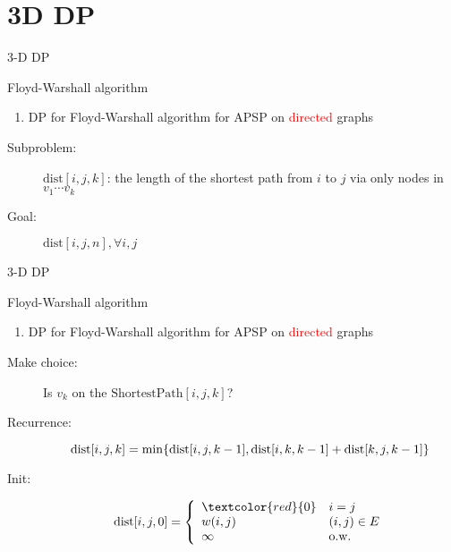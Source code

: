 \section{3D DP}

\begin{frame}{3-D DP}
  \begin{exampleblock}{Floyd-Warshall algorithm}
	\begin{enumerate}[(1)]
	  \item DP for Floyd-Warshall algorithm for APSP on \textcolor{red}{directed} graphs
	\end{enumerate}
  \end{exampleblock}

  \begin{description}
	\item[Subproblem:] $\text{dist}[i,j,k]$: the length of the shortest path from $i$ to $j$ via only nodes in $v_{1} \cdots v_{k}$
	\item[Goal:] $\text{dist}[i,j,n], \forall i,j$
  \end{description}
\end{frame}
\begin{frame}{3-D DP}
  \begin{exampleblock}{Floyd-Warshall algorithm}
	\begin{enumerate}[(1)]
	  \item DP for Floyd-Warshall algorithm for APSP on \textcolor{red}{directed} graphs
	\end{enumerate}
  \end{exampleblock}

  \begin{description}
	\item[Make choice:] Is $v_{k}$ on the $\text{ShortestPath}[i,j,k]$?
	\item[Recurrence:] 
	  \[
		\text{dist}[i,j,k] = \min \{\text{dist}[i,j,k-1], \text{dist}[i,k,k-1] + \text{dist}[k,j,k-1]\}
	  \]

	  \pause
	\item[Init:]
	  \[
		\text{dist}[i,j,0] = \left\{\begin{array}{ll}
		  \textcolor{red}{0} & i = j \\
		  w(i,j) & (i,j) \in E \\
		  \infty & \text{o.w.}
		\end{array} \right.
	  \]
  \end{description}
\end{frame}
